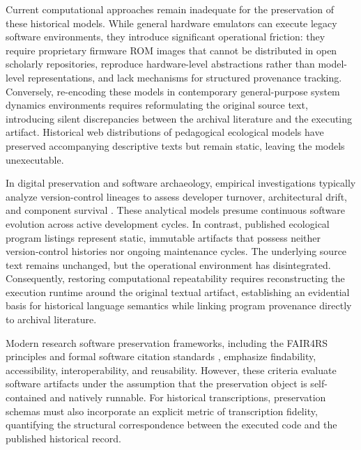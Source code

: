 \documentclass[11pt,a4paper]{article}
\begin{document}
Current computational approaches remain inadequate for the preservation of these historical models. While general hardware emulators can execute legacy software environments, they introduce significant operational friction: they require proprietary firmware ROM images that cannot be distributed in open scholarly repositories, reproduce hardware-level abstractions rather than model-level representations, and lack mechanisms for structured provenance tracking. Conversely, re-encoding these models in contemporary general-purpose system dynamics environments \citep{richmond1985,fortmannRoe2014,vensim} requires reformulating the original source text, introducing silent discrepancies between the archival literature and the executing artifact. Historical web distributions of pedagogical ecological models \citep{ortega2007} have preserved accompanying descriptive texts but remain static, leaving the models unexecutable.

In digital preservation and software archaeology, empirical investigations typically analyze version-control lineages to assess developer turnover, architectural drift, and component survival \citep{huntThomas2002,robles2005,spinellis2021}. These analytical models presume continuous software evolution across active development cycles. In contrast, published ecological program listings represent static, immutable artifacts that possess neither version-control histories nor ongoing maintenance cycles. The underlying source text remains unchanged, but the operational environment has disintegrated. Consequently, restoring computational repeatability requires reconstructing the execution runtime around the original textual artifact, establishing an evidential basis for historical language semantics while linking program provenance directly to archival literature.

Modern research software preservation frameworks, including the FAIR4RS principles \citep{barker2022} and formal software citation standards \citep{smith2016}, emphasize findability, accessibility, interoperability, and reusability. However, these criteria evaluate software artifacts under the assumption that the preservation object is self-contained and natively runnable. For historical transcriptions, preservation schemas must also incorporate an explicit metric of transcription fidelity, quantifying the structural correspondence between the executed code and the published historical record.

\end{document}
